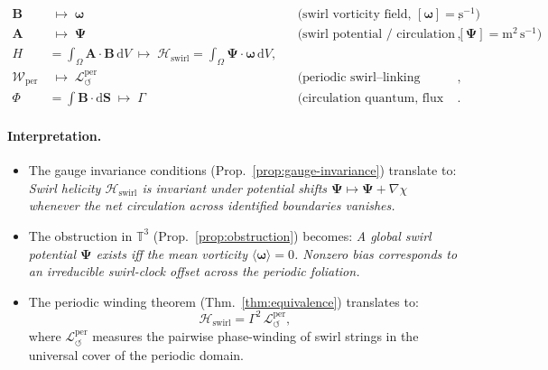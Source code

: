 \documentclass[11pt]{article}
\newcommand{\bbT}{\mathbb{T}}
\newcommand{\mean}[1]{\langle #1\rangle}
\begin{document}
    \begin{align*}
    \bm{B} &\;\longmapsto\; \boldsymbol{\omega}
    && \text{(swirl vorticity field, $[\boldsymbol{\omega}]=\mathrm{s}^{-1}$)}, \\
    \bm{A} &\;\longmapsto\; \bm{\Psi}
    && \text{(swirl potential / circulation density, $[\bm{\Psi}]=\mathrm{m}^2\!\,\mathrm{s}^{-1}$)}, \\
    H &= \int_\Omega \bm{A}\cdot \bm{B}\,\mathrm{d}V
    \;\longmapsto\; \mathcal{H}_{\text{swirl}}
    = \int_\Omega \bm{\Psi}\cdot\boldsymbol{\omega}\,\mathrm{d}V, \\
    \mathcal{W}_{\mathrm{per}}
    &\;\longmapsto\; \mathcal{L}_{\circlearrowleft}^{\mathrm{per}}
    && \text{(periodic swirl--linking density)}, \\
    \Phi &= \int \bm{B}\cdot\mathrm{d}\bm{S}
    \;\longmapsto\; \Gamma
    && \text{(circulation quantum, flux of vorticity)} .
    \end{align*}

\paragraph{Interpretation.}
    \begin{itemize}
    \item The gauge invariance conditions (Prop.~\ref{prop:gauge-invariance}) translate to:
    \emph{Swirl helicity $\mathcal{H}_{\text{swirl}}$ is invariant under potential shifts $\bm{\Psi}\mapsto \bm{\Psi}+\nabla\chi$ whenever the net circulation across identified boundaries vanishes.}

    \item The obstruction in $\bbT^3$ (Prop.~\ref{prop:obstruction}) becomes:
    \emph{A global swirl potential $\bm{\Psi}$ exists iff the mean vorticity $\mean{\boldsymbol{\omega}}=0$. Nonzero bias corresponds to an irreducible swirl-clock offset across the periodic foliation.}

    \item The periodic winding theorem (Thm.~\ref{thm:equivalence}) translates to:
    \begin{equation}
    \mathcal{H}_{\text{swirl}}
    = \Gamma^2 \, \mathcal{L}_{\circlearrowleft}^{\mathrm{per}},
    \label{eq:SST-Helicity-Linking}
    \end{equation}
    where $\mathcal{L}_{\circlearrowleft}^{\mathrm{per}}$ measures the pairwise phase-winding of swirl strings in the universal cover of the periodic domain.
    \end{itemize}
\end{document}

